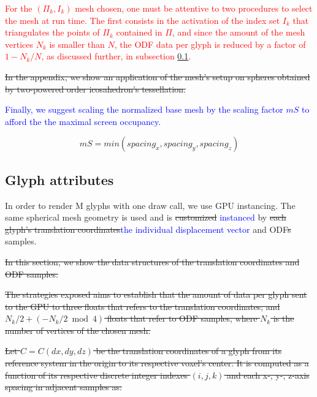 \documentclass[twoside,twocolumn,10pt]{article}
\begin{document}
\textcolor{red}{For the $(\Pi_k, I_k)$ mesh chosen, one must be attentive to two procedures to select the mesh at run time. The first consists in the activation of the index set $I_k$ that triangulates the points of $\Pi_k$ contained in $\Pi$,  and since the amount of the mesh vertices $N_k$ is smaller than $N$, the ODF data per glyph is reduced by a factor of $1-N_k/N$, as discussed further, in subsection \ref{ssec::glyph_customization}.}

\sout{In the appendix, we show an application of the mesh's setup on spheres obtained by two-powered order icosahedron's tessellation.}

\textcolor{blue}{Finally, we suggest scaling the normalized base mesh by the scaling factor $mS$ to afford the the maximal screen occupancy.}

\begin{equation}
\label{eq:spacings}
mS = min(spacing_x, spacing_y, spacing_z)
\end{equation}


\subsection{Glyph attributes}
\label{ssec::glyph_customization}

In order to render M glyphs with one draw call, we use GPU instancing. The same spherical mesh geometry is used and is \sout{customized} \textcolor{blue}{instanced} by \sout{each glyph's translation coordinates}\textcolor{blue}{the individual displacement vector} and ODF\sout{s} samples.

\sout{In this section, we show the data structures of the translation coordinates and ODF samples.}

\sout{The strategies exposed aims to establish that the amount of data per glyph sent to the GPU to three floats that refers to the translation coordinates; and $N_k/2 + (-N_k/2 \bmod 4)$ floats that refer to ODF samples, where $N_k$ is the number of vertices of the chosen mesh.}

\sout{Let $C= C(dx, dy, dz)$ be the translation coordinates of a glyph from its reference system in the origin to its respective voxel's center. It is computed as a function of its respective discrete integer indexes $(i, j, k)$ and each x-, y-, z-axis 
spacing in adjacent samples as:}
\end{document}
